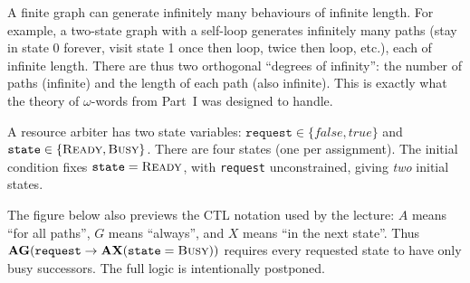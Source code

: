 A finite graph can generate infinitely many behaviours of infinite length.
For example, a two-state graph with a self-loop generates infinitely many
paths (stay in state 0 forever, visit state 1 once then loop, twice then
loop, etc.), each of infinite length.  There are thus two orthogonal
``degrees of infinity'': the number of paths (infinite) and the length of
each path (also infinite).  This is exactly what the theory of $\omega$-words
from Part~I was designed to handle.

\begin{example}
\label{ex:arbiter-kripke}
A resource arbiter has two state variables:
$\texttt{request} \in \{\mathit{false}, \mathit{true}\}$ and
$\texttt{state} \in \{\textsc{Ready}, \textsc{Busy}\}$.  There are four
states (one per assignment).  The initial condition fixes
$\texttt{state} = \textsc{Ready}$, with \texttt{request} unconstrained,
giving \emph{two} initial states.

The figure below also previews the CTL notation used by the lecture:
\(A\) means ``for all paths'', \(G\) means ``always'', and \(X\) means
``in the next state''.  Thus
\(\mathbf{AG}(\texttt{request}\to
\mathbf{AX}(\texttt{state}=\textsc{Busy}))\) requires every requested state
to have only busy successors.  The full logic is intentionally postponed.


\end{example}
